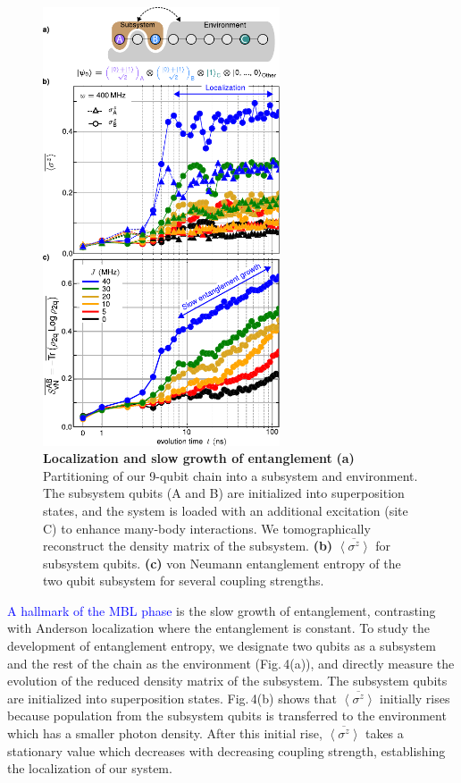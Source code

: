 \begin{figure}[t]
\includegraphics[width=70mm]{./PDF/fig_4.pdf}
\vspace{-0.7em}
\caption{\small{
\textbf{Localization and slow growth of entanglement}
\textbf{(a)} Partitioning of our 9-qubit chain into a subsystem and environment.
 The subsystem qubits (A and B) are initialized into superposition states, and the system is loaded with an additional excitation (site C) to enhance many-body interactions. We tomographically reconstruct the  density matrix of the subsystem. \textbf{(b)} $\overline{\left< \sigma^z \right>}$ for subsystem qubits. \textbf{(c)} von Neumann entanglement entropy of the two qubit subsystem for several coupling strengths.}}
\end{figure}


\textcolor{blue}{A hallmark of the MBL phase} is the slow growth of entanglement, contrasting with Anderson localization where the entanglement is constant. To study the development of entanglement entropy, we designate two qubits as a subsystem and the rest of the chain as the environment (Fig.\,4(a)), and directly measure the evolution of the reduced density matrix of the subsystem. The subsystem qubits are initialized into superposition states. Fig.\,4(b) shows that $\overline{ \left< \sigma^z \right> }$ initially rises because population from the subsystem qubits is transferred to the environment which has a smaller photon density. After this initial rise, $\overline{ \left< \sigma^z \right> }$ takes a stationary value which decreases with decreasing coupling strength, establishing the localization of our system.

